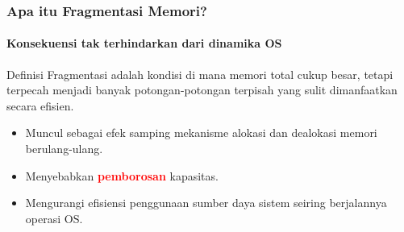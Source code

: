 \documentclass[t,aspectratio=169,xcolor=dvipsnames]{beamer}
\newcommand{\tem}[1]{\textbf{\textcolor{red}{#1}}}
\begin{document}
\begin{frame}
    \frametitle{Apa itu Fragmentasi Memori?}
    \framesubtitle{Konsekuensi tak terhindarkan dari dinamika OS}
    \small
    \begin{block}{Definisi}
        Fragmentasi adalah kondisi di mana memori total cukup besar, tetapi terpecah menjadi banyak potongan-potongan terpisah yang sulit dimanfaatkan secara efisien.
    \end{block}
    \vspace{0.2cm}
    \begin{itemize}
        \item Muncul sebagai efek samping mekanisme alokasi dan dealokasi memori berulang-ulang.
        \item Menyebabkan \tem{pemborosan} kapasitas.
        \item Mengurangi efisiensi penggunaan sumber daya sistem seiring berjalannya operasi OS.
    \end{itemize}
\end{frame}
\end{document}
